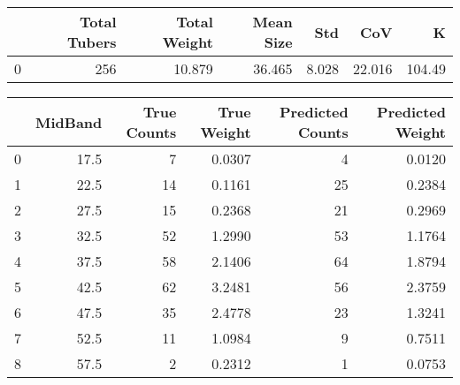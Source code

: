\begin{tabular}{lrrrrrr}
\toprule
{} &  Total Tubers &  Total Weight &  Mean Size &    Std &     CoV &       K \\
\midrule
0 &           256 &        10.879 &     36.465 &  8.028 &  22.016 &  104.49 \\
\bottomrule
\end{tabular}

\begin{tabular}{lrrrrr}
\toprule
{} &  MidBand &  True Counts &  True Weight &  Predicted Counts &  Predicted Weight \\
\midrule
0 &     17.5 &            7 &       0.0307 &                 4 &            0.0120 \\
1 &     22.5 &           14 &       0.1161 &                25 &            0.2384 \\
2 &     27.5 &           15 &       0.2368 &                21 &            0.2969 \\
3 &     32.5 &           52 &       1.2990 &                53 &            1.1764 \\
4 &     37.5 &           58 &       2.1406 &                64 &            1.8794 \\
5 &     42.5 &           62 &       3.2481 &                56 &            2.3759 \\
6 &     47.5 &           35 &       2.4778 &                23 &            1.3241 \\
7 &     52.5 &           11 &       1.0984 &                 9 &            0.7511 \\
8 &     57.5 &            2 &       0.2312 &                 1 &            0.0753 \\
\bottomrule
\end{tabular}
